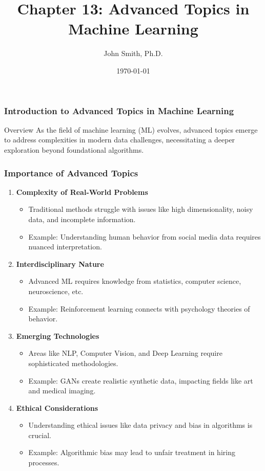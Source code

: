 \documentclass[aspectratio=169]{beamer}
\title[Advanced Topics in ML]{Chapter 13: Advanced Topics in Machine Learning}
\author[J. Smith]{John Smith, Ph.D.}
\institute[University Name]{
  Department of Computer Science\\
  University Name\\
  \vspace{0.3cm}
  Email: email@university.edu\\
  Website: www.university.edu
}
\date{\today}
\begin{document}
\frame{\titlepage}

\begin{frame}[fragile]
    \frametitle{Introduction to Advanced Topics in Machine Learning}
    \begin{block}{Overview}
        As the field of machine learning (ML) evolves, advanced topics emerge to address complexities in modern data challenges, necessitating a deeper exploration beyond foundational algorithms.
    \end{block}
\end{frame}

\begin{frame}[fragile]
    \frametitle{Importance of Advanced Topics}
    \begin{enumerate}
        \item \textbf{Complexity of Real-World Problems}
        \begin{itemize}
            \item Traditional methods struggle with issues like high dimensionality, noisy data, and incomplete information.
            \item Example: Understanding human behavior from social media data requires nuanced interpretation.
        \end{itemize}

        \item \textbf{Interdisciplinary Nature}
        \begin{itemize}
            \item Advanced ML requires knowledge from statistics, computer science, neuroscience, etc.
            \item Example: Reinforcement learning connects with psychology theories of behavior.
        \end{itemize}

        \item \textbf{Emerging Technologies}
        \begin{itemize}
            \item Areas like NLP, Computer Vision, and Deep Learning require sophisticated methodologies.
            \item Example: GANs create realistic synthetic data, impacting fields like art and medical imaging.
        \end{itemize}

        \item \textbf{Ethical Considerations}
        \begin{itemize}
            \item Understanding ethical issues like data privacy and bias in algorithms is crucial.
            \item Example: Algorithmic bias may lead to unfair treatment in hiring processes.
        \end{itemize}
    \end{enumerate}
\end{frame}
\end{document}
